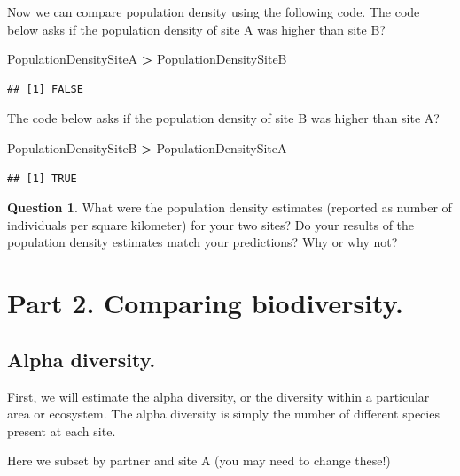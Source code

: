 \documentclass[]{book}
\newenvironment{Shaded}{\begin{snugshade}}{\end{snugshade}}
\newcommand{\NormalTok}[1]{#1}
\newcommand{\OperatorTok}[1]{\textcolor[rgb]{0.81,0.36,0.00}{\textbf{#1}}}
\newcommand{\StringTok}[1]{\textcolor[rgb]{0.31,0.60,0.02}{#1}}
\begin{document}
Now we can compare population density using the following code. The code below asks if the population density of site A was higher than site B?

\begin{Shaded}
\begin{Highlighting}[]
\NormalTok{PopulationDensitySiteA }\OperatorTok{>}\StringTok{ }\NormalTok{PopulationDensitySiteB}
\end{Highlighting}
\end{Shaded}

\begin{verbatim}
## [1] FALSE
\end{verbatim}

The code below asks if the population density of site B was higher than site A?

\begin{Shaded}
\begin{Highlighting}[]
\NormalTok{PopulationDensitySiteB }\OperatorTok{>}\StringTok{ }\NormalTok{PopulationDensitySiteA}
\end{Highlighting}
\end{Shaded}

\begin{verbatim}
## [1] TRUE
\end{verbatim}

\textbf{Question 1}. What were the population density estimates (reported as number of individuals per square kilometer) for your two sites? Do your results of the population density estimates match your predictions? Why or why not?

\hypertarget{part-2.-comparing-biodiversity.}{%
\section{Part 2. Comparing biodiversity.}\label{part-2.-comparing-biodiversity.}}

\hypertarget{alpha-diversity.}{%
\subsection{Alpha diversity.}\label{alpha-diversity.}}

First, we will estimate the alpha diversity, or the diversity within a particular area or ecosystem. The alpha diversity is simply the number of different species present at each site.

Here we subset by partner and site A (you may need to change these!)
\end{document}
